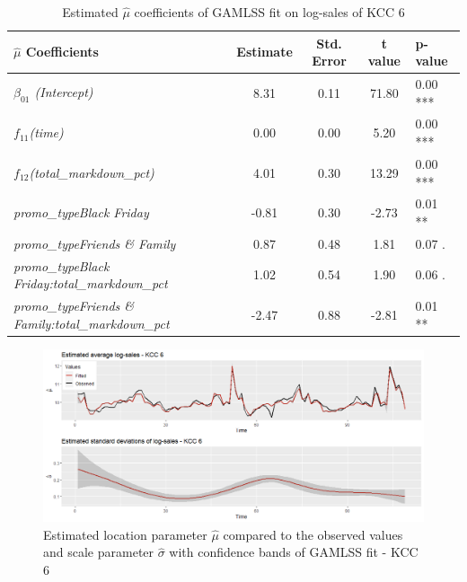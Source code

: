 \begin{table}[H]
\centering
\begin{tabular}{l|c|c|c|l}
  \hline
  \rowcolor{white}
 \textbf{$\hat{\mu}$ Coefficients} & \textbf{Estimate} & \textbf{Std. Error} & \textbf{t value} & \textbf{p-value} \\ 
  \hline\hline
\textit{$\beta_{01}$ (Intercept)} & 8.31 & 0.11 & 71.80 & 0.00 *** \\ 
  \textit{$f_{11}$(time)} & 0.00 & 0.00 & 5.20 & 0.00 *** \\ 
  \textit{$f_{12}$(total\_markdown\_pct)} & 4.01 & 0.30 & 13.29 & 0.00 *** \\ 
  \textit{promo\_typeBlack Friday} & -0.81 & 0.30 & -2.73 & 0.01 ** \\ 
  \textit{promo\_typeFriends \& Family} & 0.87 & 0.48 & 1.81 & 0.07 . \\ 
  \textit{promo\_typeBlack Friday:total\_markdown\_pct} & 1.02 & 0.54 & 1.90 & 0.06 . \\ 
  \textit{promo\_typeFriends \& Family:total\_markdown\_pct} & -2.47 & 0.88 & -2.81 & 0.01 ** \\ \hline
\end{tabular}
\caption{Estimated $\hat{\mu}$ coefficients of \ac{GAMLSS} fit on log-sales of \ac{KCC} 6}
\label{tab:gamlss_coeff_kcc_6}
\end{table}





\begin{figure}[H]
\centering
  \includegraphics[width=0.95\linewidth]{figures/gamlss_kcc_6_estimated_parameters.png}
  \caption{Estimated location parameter $\hat{\mu}$ compared to the observed values and scale parameter $\hat{\sigma}$ with confidence bands of GAMLSS fit - KCC 6}
  \label{fig:gamlss_kcc_6_estimated_parameters}
\end{figure}



